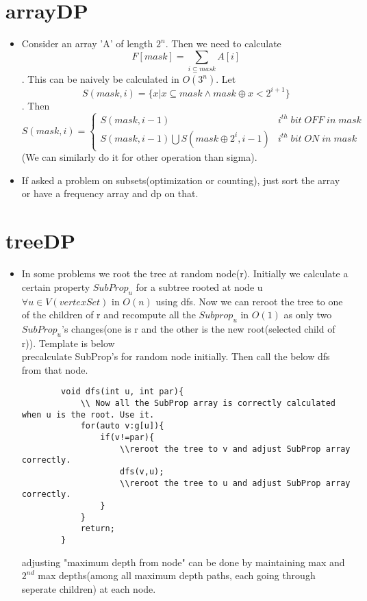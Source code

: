 \documentclass[../Notes.tex]{subfiles}
\begin{document}
\section{arrayDP}
\begin{itemize}
	\item Consider an array 'A' of length $2^n$. Then we need to calculate
	$$F[mask] = \sum_{i\subseteq mask}A[i]$$. This can be naively be calculated in $O(3^n)$.
	Let $$S(mask,i) = \{x|x\subseteq mask\wedge mask\oplus x < 2^{i+1}\}$$.
	Then \[ S(mask,i)=\begin{cases} 
      S(mask,i-1) & i^{th}\; bit\; OFF\; in\; mask  \\
      S(mask,i-1) \bigcup S(mask\oplus 2^i,i-1) & i^{th}\; bit\; ON\; in\; mask
   \end{cases}
\]
	(We can similarly do it for other operation than sigma).	
	
	\item If asked a problem on subsets(optimization or counting), just sort the array or have a frequency array and dp on that. 
	
\end{itemize}
\section{treeDP}
\begin{itemize}
	\item In some problems we root the tree at random node(r). Initially we calculate a certain property $SubProp_{u}$ for a subtree rooted at node u $\forall u \in V(vertexSet)$ in $O(n)$ using dfs. Now we can reroot the tree to one of the children of r and recompute all the $Subprop_u$ in $O(1)$ as only two $SubProp_u$'s changes(one is r and the other is the new root(selected child of r)). Template is below\\
precalculate SubProp's for random node initially. Then call the below dfs from that node.
	\begin{lstlisting}
		void dfs(int u, int par){
			\\ Now all the SubProp array is correctly calculated when u is the root. Use it.
			for(auto v:g[u]){
				if(v!=par){
					\\reroot the tree to v and adjust SubProp array correctly.
					dfs(v,u);
					\\reroot the tree to u and adjust SubProp array correctly.
				}
			}
			return;
		}
	\end{lstlisting}
	adjusting "maximum depth from node" can be done by maintaining max and $2^{nd}$ max depths(among all maximum depth paths, each going through seperate children) at each node. 
\end{itemize}
\end{document}
